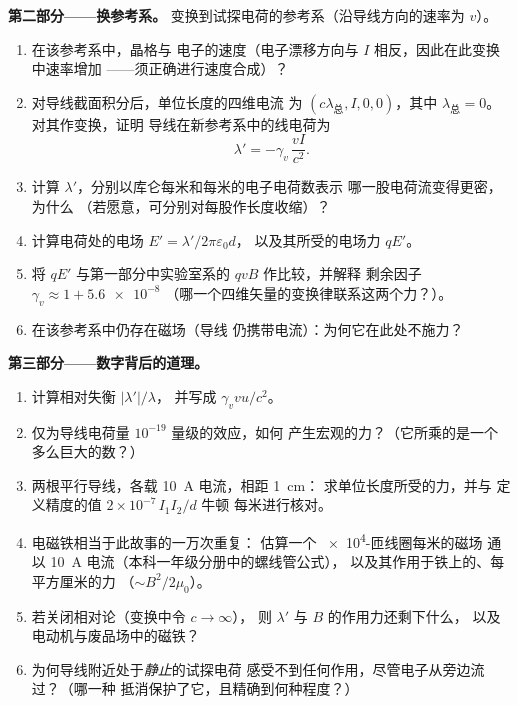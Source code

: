 \begin{problem}
\medskip\noindent\textbf{第二部分——换参考系。}
变换到试探电荷的参考系（沿导线方向的速率为 $v$）。
\begin{enumerate}[resume]
  \item 在该参考系中，晶格与
        电子的速度（电子漂移方向与 $I$ 相反，因此在此变换中速率增加
        ——须正确进行速度合成）？
  \item 对导线截面积分后，单位长度的四维电流
        为 $(c\lambda_{\text{总}}, I, 0, 0)$，其中
        $\lambda_{\text{总}} = 0$。对其作变换，证明
        导线在新参考系中的线电荷为
        \[
        \lambda' = -\gamma_v\,\frac{vI}{c^2} .
        \]
  \item 计算 $\lambda'$，分别以库仑每米和每米的电子电荷数表示
        哪一股电荷流变得更密，为什么
        （若愿意，可分别对每股作长度收缩）？
  \item 计算电荷处的电场 $E' = \lambda'/2\pi\varepsilon_0d$，
        以及其所受的电场力 $qE'$。
  \item 将 $qE'$ 与第一部分中实验室系的 $qvB$ 作比较，并解释
        剩余因子 $\gamma_v \approx 1 + \num{5.6e-8}$
        （哪一个四维矢量的变换律联系这两个力？）。
  \item 在该参考系中仍存在磁场（导线
        仍携带电流）：为何它在此处不施力？
\end{enumerate}

\medskip\noindent\textbf{第三部分——数字背后的道理。}
\begin{enumerate}[resume]
  \item 计算相对失衡 $|\lambda'|/\lambda$，
        并写成 $\gamma_v vu/c^2$。
  \item 仅为导线电荷量 $10^{-19}$ 量级的效应，如何
        产生宏观的力？（它所乘的是一个
        多么巨大的数？）
  \item 两根平行导线，各载 \qty{10}{A} 电流，相距 \qty{1}{cm}：
        求单位长度所受的力，并与
        定义精度的值 $2 \times 10^{-7}\,I_1I_2/d$ 牛顿
        每米进行核对。
  \item 电磁铁相当于此故事的一万次重复：
        估算一个 \qty{e4}{}-匝线圈每米的磁场
        通以 \qty{10}{A} 电流（本科一年级分册中的螺线管公式），
        以及其作用于铁上的、每平方厘米的力
        （$\sim B^2/2\mu_0$）。
  \item 若关闭相对论（变换中令 $c \to \infty$），
        则 $\lambda'$ 与 $B$ 的作用力还剩下什么，
        以及电动机与废品场中的磁铁？
  \item 为何导线附近处于\emph{静止}的试探电荷
        感受不到任何作用，尽管电子从旁边流过？（哪一种
        抵消保护了它，且精确到何种程度？）
\end{enumerate}


\end{problem}
